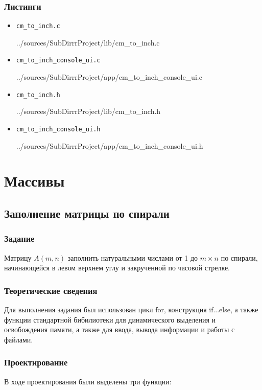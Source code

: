 \documentclass[12pt,a4paper]{report}
\begin{document}
\subsection*{Листинги}
\begin{itemize}
\item[] \verb-cm_to_inch.c-

{../sources/SubDirrrProject/lib/cm_to_inch.c}
\item[] \verb-cm_to_inch_console_ui.c-

{../sources/SubDirrrProject/app/cm_to_inch_console_ui.c}
\item[] \verb-cm_to_inch.h-

{../sources/SubDirrrProject/lib/cm_to_inch.h}
\item[] \verb-cm_to_inch_console_ui.h-

{../sources/SubDirrrProject/app/cm_to_inch_console_ui.h}
\end{itemize}

%
\chapter{Массивы}
\section{Заполнение матрицы по спирали}
\subsection{Задание}
\hspace{\parindent}
Матрицу $A(m,n)$ заполнить натуральными числами от 1 до $m \times n$ по спирали, начинающейся в левом верхнем углу и закрученной по часовой стрелке.

\subsection{Теоретические сведения}
\hspace{\parindent}
Для выполнения задания был использован цикл for, конструкция if...else, а также функции стандартной бибилиотеки для динамического выделения и освобождения памяти, а также для ввода, вывода информации и работы с файлами.

\subsection{Проектирование}
\hspace{\parindent} 
В ходе проектирования были выделены три функции:
\end{document}
